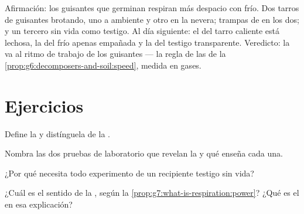 \begin{example}\label{ex:g7:what-is-respiration:coldseed}
Afirmación: los guisantes que germinan respiran más despacio con frío.
Dos tarros de guisantes brotando, uno a  ambiente y otro en
la nevera; trampas de  en los dos; y un tercero sin vida
como testigo. Al día siguiente: el  del tarro caliente está
lechosa, la del frío apenas empañada y la del testigo transparente.
Veredicto: la  va al ritmo de trabajo de los guisantes ---
la regla de las  de la
\cref{prop:g6:decomposers-and-soil:speed}, medida en gases.
\end{example}

\section{Ejercicios}

\begin{exercise}[$\star$]\label{exo:g7:what-is-respiration:1}
Define la  y distínguela de la .
\end{exercise}

\begin{exercise}[$\star$]\label{exo:g7:what-is-respiration:2}
Nombra las dos pruebas de laboratorio que revelan la  y qué
enseña cada una.
\end{exercise}

\begin{exercise}[$\star$]\label{exo:g7:what-is-respiration:3}
¿Por qué necesita todo experimento de  un recipiente testigo
sin vida?
\end{exercise}

\begin{exercise}[$\star$]\label{exo:g7:what-is-respiration:4}
¿Cuál es el sentido de la , según la
\cref{prop:g7:what-is-respiration:power}? ¿Qué es el 
en esa explicación?
\end{exercise}

